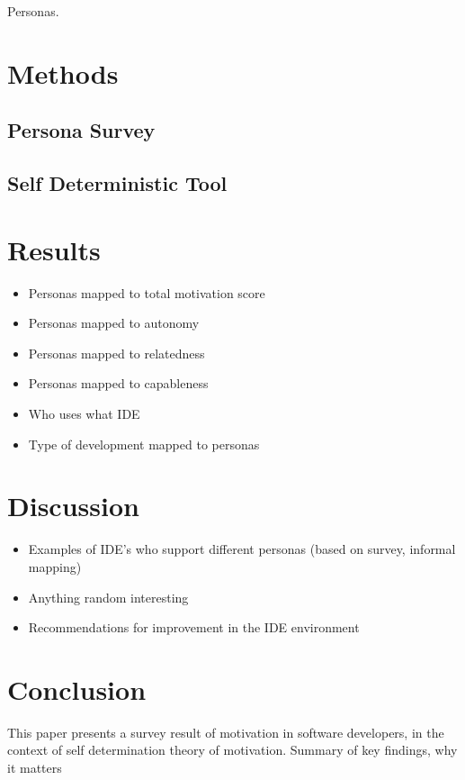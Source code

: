 \documentclass[conference]{IEEEtran}
\begin{document}
Personas.

\section{Methods}

\subsection{Persona Survey}

\subsection{Self Deterministic Tool}

\section{Results}

\begin{itemize}
\item
  Personas mapped to total motivation score
\item
  Personas mapped to autonomy
\item
  Personas mapped to relatedness
\item
  Personas mapped to capableness
\item
  Who uses what IDE
\item
  Type of development mapped to personas
\end{itemize}

\section{Discussion}

\begin{itemize}
\item
  Examples of IDE's who support different personas (based on survey,
  informal mapping)
\item
  Anything random interesting
\item
  Recommendations for improvement in the IDE environment
\end{itemize}

\section{Conclusion}

This paper presents a survey result of motivation in software
developers, in the context of self determination theory of motivation.
Summary of key findings, why it matters
\end{document}
